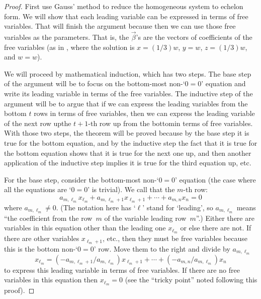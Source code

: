 \begin{proof}
First use Gauss' method to reduce the homogeneous system to echelon form.
We will show that each leading variable can be expressed in terms of
free variables.
That will finish the argument because then 
we can use those free variables as the parameters.
That is, the $\vec{\beta}$'s are the vectors of coefficients of the
free variables (as in ,
where the solution is
$x=(1/3)w$,  $y=w$, $z=(1/3)w$, and $w=w$). 

We will proceed by mathematical induction, which has two steps.
The base step of the argument will be to focus on the
bottom-most non-`\( 0=0 \)' equation and 
write its leading variable in terms of the free variables.
The inductive step of the argument will be to
argue that if we can express the leading variables from the
bottom \( t \) rows in terms of free variables, then
we can express the leading variable of the next row up\Dash the \( t+1 \)-th
row up from the bottom\Dash in terms of free variables.
With those two steps, the theorem will be proved
because by the base step it is true for the bottom equation, 
and by the inductive step the fact that it is true for the bottom
equation shows that 
it is true for the next one up, and then another application of
the inductive step implies it is true for the third equation up,
etc.

For the base step, consider the bottom-most
non-`\( 0=0 \)' equation
(the case where all the equations are `$0=0$' is trivial).
We call that the $m$-th row:
\begin{equation*}
  a_{m,\ell_m}x_{\ell_m}+a_{m,\ell_m+1}x_{\ell_m+1}+\cdots+a_{m,n}x_n=0
\end{equation*}
where \( a_{m,\ell_m}\neq 0 \).
(The notation here has `$\ell$' stand for `leading', 
so $a_{m,\ell_m}$ means ``the coefficient
from the row~$m$ of the variable leading row~$m$''.)
Either there are variables in this equation other than the leading one
$x_{\ell_m}$ or else there are not.
If there are other variables $x_{\ell_{m}+1}$, etc., then they must be
free variables because this is the bottom non-`$0=0$' row. 
Move them to the right and divide by $a_{m,\ell_m}$
\begin{equation*}
  x_{\ell_m}
  =(-a_{m,\ell_m+1}/a_{m,\ell_m})x_{\ell_m+1}+\cdots+(-a_{m,n}/a_{m,\ell_m})x_n
\end{equation*}
to express this leading variable in terms of free variables.
If there are no free variables in this equation 
then \( x_{\ell_m}=0 \) (see the
``tricky point'' noted following this proof).


\end{proof}
